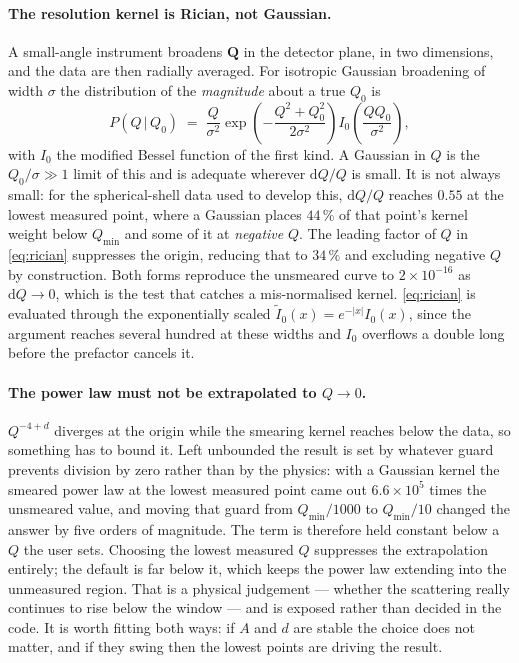 \documentclass[11pt,a4paper]{article}
\begin{document}
\paragraph{The resolution kernel is Rician, not Gaussian.} A small-angle
instrument broadens $\mathbf{Q}$ in the detector plane, in two dimensions, and
the data are then radially averaged. For isotropic Gaussian broadening of
width $\sigma$ the distribution of the \emph{magnitude} about a true $Q_0$ is
\begin{equation}
  P(Q\,|\,Q_0) \;=\; \frac{Q}{\sigma^{2}}
  \exp\!\left(-\frac{Q^{2}+Q_0^{2}}{2\sigma^{2}}\right)
  I_0\!\left(\frac{QQ_0}{\sigma^{2}}\right),
  \label{eq:rician}
\end{equation}
with $I_0$ the modified Bessel function of the first kind. A Gaussian in $Q$
is the $Q_0/\sigma \gg 1$ limit of this and is adequate wherever
$\mathrm{d}Q/Q$ is small. It is not always small: for the spherical-shell data
used to develop this, $\mathrm{d}Q/Q$ reaches $0.55$ at the lowest measured
point, where a Gaussian places $44\,\%$ of that point's kernel weight below
$Q_{\min}$ and some of it at \emph{negative} $Q$. The leading factor of $Q$ in
\eqref{eq:rician} suppresses the origin, reducing that to $34\,\%$ and
excluding negative $Q$ by construction. Both forms reproduce the unsmeared
curve to $2\times10^{-16}$ as $\mathrm{d}Q\to0$, which is the test that
catches a mis-normalised kernel. \eqref{eq:rician} is evaluated through the
exponentially scaled $\tilde{I}_0(x) = e^{-|x|}I_0(x)$, since the argument
reaches several hundred at these widths and $I_0$ overflows a double long
before the prefactor cancels it.

\paragraph{The power law must not be extrapolated to $Q\to0$.} $Q^{-4+d}$
diverges at the origin while the smearing kernel reaches below the data, so
something has to bound it. Left unbounded the result is set by whatever guard
prevents division by zero rather than by the physics: with a Gaussian kernel
the smeared power law at the lowest measured point came out $6.6\times10^{5}$
times the unsmeared value, and moving that guard from $Q_{\min}/1000$ to
$Q_{\min}/10$ changed the answer by five orders of magnitude. The term is
therefore held constant below a $Q$ the user sets. Choosing the lowest
measured $Q$ suppresses the extrapolation entirely; the default is far below
it, which keeps the power law extending into the unmeasured region. That is a
physical judgement --- whether the scattering really continues to rise below
the window --- and is exposed rather than decided in the code. It is worth
fitting both ways: if $A$ and $d$ are stable the choice does not matter, and
if they swing then the lowest points are driving the result.
\end{document}

